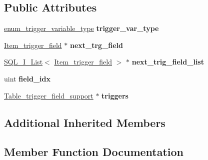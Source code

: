 \subsection*{Public Attributes}
\begin{DoxyCompactItemize}
\item 
\mbox{\label{classItem__trigger__field_ac03098ae0412e1c5434ba96aed646646}} 
\mbox{\hyperlink{trigger__def_8h_a21eb81babac229407b0b483596163bc2}{enum\+\_\+trigger\+\_\+variable\+\_\+type}} {\bfseries trigger\+\_\+var\+\_\+type}
\item 
\mbox{\label{classItem__trigger__field_a9f0dec9a85de8a67b87dd1ab9fe777e5}} 
\mbox{\hyperlink{classItem__trigger__field}{Item\+\_\+trigger\+\_\+field}} $\ast$ {\bfseries next\+\_\+trg\+\_\+field}
\item 
\mbox{\label{classItem__trigger__field_a1e8fd9a9cd7ed47d65fc788deb3bc719}} 
\mbox{\hyperlink{classSQL__I__List}{S\+Q\+L\+\_\+\+I\+\_\+\+List}}$<$ \mbox{\hyperlink{classItem__trigger__field}{Item\+\_\+trigger\+\_\+field}} $>$ $\ast$ {\bfseries next\+\_\+trig\+\_\+field\+\_\+list}
\item 
\mbox{\label{classItem__trigger__field_a52d71c5fee3328fc49bb05b761c6619b}} 
uint {\bfseries field\+\_\+idx}
\item 
\mbox{\label{classItem__trigger__field_ab149ce4101102588a50ee1c23a4771e9}} 
\mbox{\hyperlink{classTable__trigger__field__support}{Table\+\_\+trigger\+\_\+field\+\_\+support}} $\ast$ {\bfseries triggers}
\end{DoxyCompactItemize}
\subsection*{Additional Inherited Members}


\subsection{Member Function Documentation}
\mbox{\label{classItem__trigger__field_a8ad192808fbb5d42dbc49a0809355478}} 
